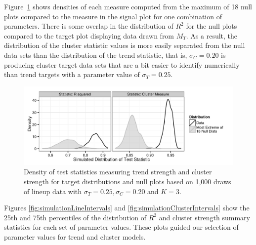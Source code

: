 \documentclass[11pt]{isuthesis}\usepackage[]{graphicx}\usepackage[]{color}
\makeatletter
\def\maxwidth{ %
  \ifdim\Gin@nat@width>\linewidth
    \linewidth
  \else
    \Gin@nat@width
  \fi
}
\newenvironment{knitrout}{}{} %
\makeatother
\begin{document}
Figure~\ref{fig:targetsignal-0} shows densities of each measure computed from the  maximum of 18 null plots compared to the measure in the signal plot for one combination of parameters.
There is some overlap in the distribution of $R^2$ for the null plots compared to the target plot displaying data drawn from $M_T$. As a result, the distribution of the cluster statistic values is more easily separated from the null data sets than the distribution of the trend statistic, that is, $\sigma_C = 0.20$ is producing cluster target data sets that are a bit easier to identify numerically than trend targets with a parameter value of $\sigma_T = 0.25$.

\begin{figure}[h]
\centering
\begin{knitrout}
\color{fgcolor}

{\centering \includegraphics[width=\maxwidth]{Figure/FeatureHierarchy/fig-null-distribution-1-1} 

}



\end{knitrout}
\caption[Simulation-based test statistic density for null and target plots]{\label{fig:targetsignal-0}Density of test statistics measuring trend strength and cluster strength for target distributions and null plots based on 1,000 draws of lineup data with $\sigma_T= 0.25, \sigma_C=0.20$ and $K=3$. }
\end{figure}

Figures \ref{fig:simulationLineIntervals} and \ref{fig:simulationClusterIntervals} show the 25th and 75th percentiles of the distribution of $R^2$ and cluster strength summary statistics for each set of parameter values. These plots guided our selection of parameter values for trend and cluster models. 
\end{document}
